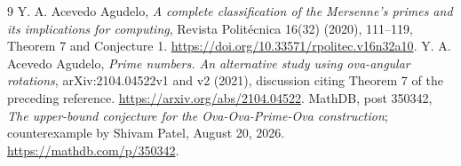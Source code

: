\documentclass[11pt]{article}
\begin{document}
\begin{thebibliography}{9}
 Y. A. Acevedo Agudelo, \emph{A complete classification of the Mersenne's primes and its implications for computing}, Revista Polit\'ecnica 16(32) (2020), 111--119, Theorem 7 and Conjecture 1. \url{https://doi.org/10.33571/rpolitec.v16n32a10}.
 Y. A. Acevedo Agudelo, \emph{Prime numbers. An alternative study using ova-angular rotations}, arXiv:2104.04522v1 and v2 (2021), discussion citing Theorem 7 of the preceding reference. \url{https://arxiv.org/abs/2104.04522}.
 MathDB, post 350342, \emph{The upper-bound conjecture for the Ova-Ova-Prime-Ova construction}; counterexample by Shivam Patel, August 20, 2026. \url{https://mathdb.com/p/350342}.
\end{thebibliography}
\end{document}
